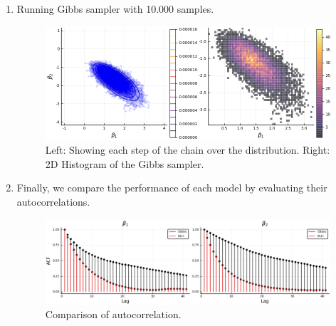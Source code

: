 \documentclass[12pt,letterpaper]{article}
\begin{document}
\begin{enumerate}[leftmargin=!,labelindent=5pt]
\item Running Gibbs sampler with 10.000 samples.
\begin{figure}[H]
    \centering
    \includegraphics[width=15cm]{images/Ex6_4.png}
    \caption{ Left: Showing each step of the chain over the distribution.
    Right: 2D Histogram of the Gibbs sampler.
    }
    \label{fig:4}
\end{figure}

\item Finally, we compare the performance of each model by evaluating
their autocorrelations.
\begin{figure}[H]
    \centering
    \includegraphics[width=15cm]{images/Ex6_6.png}
    \caption{ Comparison of autocorrelation.
    }
    \label{fig:5}
\end{figure}

\end{enumerate}
\end{document}
